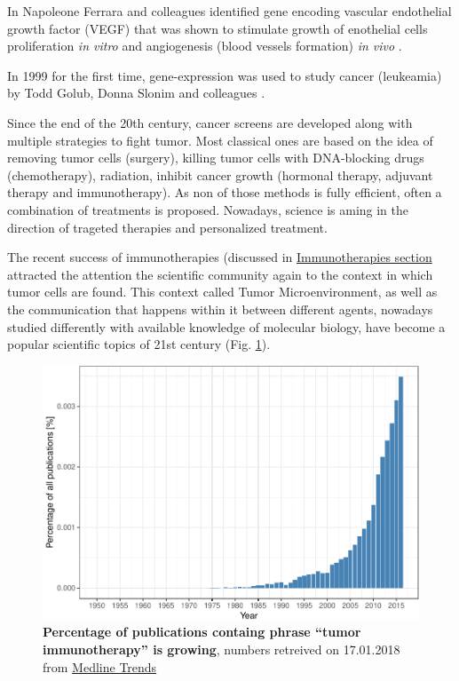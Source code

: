 \documentclass[12pt,]{book}
\theoremstyle{definition}
\theoremstyle{definition}
\theoremstyle{definition}
\theoremstyle{remark}
\begin{document}
In Napoleone Ferrara and colleagues identified gene encoding vascular
endothelial growth factor (VEGF) that was shown to stimulate growth of
enothelial cells proliferation \emph{in vitro} and angiogenesis (blood
vessels formation) \emph{in vivo} \citep{Leung1989}.

In 1999 for the first time, gene-expression was used to study cancer
(leukeamia) by Todd Golub, Donna Slonim and colleagues
\citep{Golub1999}.

Since the end of the 20th century, cancer screens are developed along
with multiple strategies to fight tumor. Most classical ones are based
on the idea of removing tumor cells (surgery), killing tumor cells with
DNA-blocking drugs (chemotherapy), radiation, inhibit cancer growth
(hormonal therapy, adjuvant therapy and immunotherapy). As non of those
methods is fully efficient, often a combination of treatments is
proposed. Nowadays, science is aming in the direction of trageted
therapies and personalized treatment.

The recent success of immunotherapies (discussed in
\protect\hyperlink{immunotherapies}{Immunotherapies section} attracted
the attention the scientific community again to the context in which
tumor cells are found. This context called Tumor Microenvironment, as
well as the communication that happens within it between different
agents, nowadays studied differently with available knowledge of
molecular biology, have become a popular scientific topics of 21st
century (Fig. \ref{fig:pubmedTME}).

\begin{figure}

{\centering \includegraphics[width=0.7\linewidth]{UCzPhDThesis_files/figure-latex/pubmedTME-1} 

}

\caption{\textbf{Percentage of publications containg
phrase ``tumor immunotherapy'' is growing}, numbers retreived on
17.01.2018 from \href{http://dan.corlan.net/medline-trend.html}{Medline
Trends} \citep{Corlan2004}}\label{fig:pubmedTME}
\end{figure}
\end{document}
